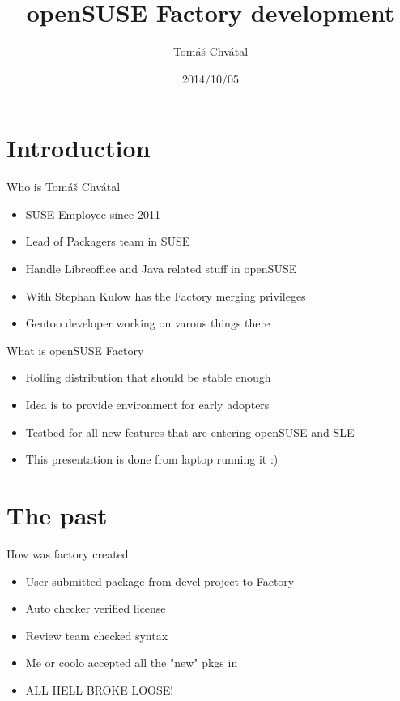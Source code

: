 \documentclass{beamer}
\author{Tom\'{a}\v{s} Chv\'{a}tal\newline {\small L3/SUSE Packagers}}
\title{openSUSE Factory development}
\date{2014/10/05}
\begin{document}
\begin{frame}[t,plain]
\titlepage
\end{frame}

\section{Introduction}

\begin{frame}[t]{Who is Tomáš Chvátal}
	\begin{itemize}
	\item SUSE Employee since 2011
	\item Lead of Packagers team in SUSE
	\item Handle Libreoffice and Java related stuff in openSUSE
	\item With Stephan  Kulow has the Factory merging privileges
	\item Gentoo developer working on varous things there
	\end{itemize}
\end{frame}

\begin{frame}[t]{What is openSUSE Factory}
	\begin{itemize}
	\item Rolling distribution that should be stable enough
	\item Idea is to provide environment for early adopters
	\item Testbed for all new features that are entering openSUSE and SLE
	\item This presentation is done from laptop running it :)
	\end{itemize}
\end{frame}

\section{The past}

\begin{frame}[t]{How was factory created}
	\begin{itemize}
	\item User submitted package from devel project to Factory
	\item Auto checker verified license
	\item Review team checked syntax
	\item Me or coolo accepted all the "new" pkgs in
	\item ALL HELL BROKE LOOSE!
	\end{itemize}
\end{frame}
\end{document}
